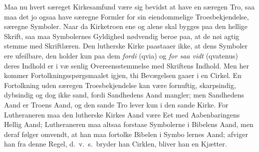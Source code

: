 \documentclass[12pt,a4paper]{article}
\begin{document}
Maa nu hvert særeget Kirkesamfund være sig bevidst at
have en særegen Tro, saa maa det jo ogsaa have særegne Formler
for sin eiendommelige Troesbekjendelse, særegne Symboler. Naar
da Kirketroen ene og alene skal bygges paa den hellige Skrift,
saa maa Symbolernes Gyldighed nødvendig beroe paa, at de nøi\-%
agtig stemme med Skriftlæren. Den lutherske Kirke paastaaer
ikke, at dens Symboler ere ufeilbare, den holder kun paa dem
\emph{fordi} (qvia) og \emph{for saa vidt} (qvatenus) deres Indhold er i væ\-%
senlig Overeensstemmelse med Skriftens Indhold. Men her kommer
Fortolkningsspørgsmaalet igjen, thi Bevægelsen gaaer i en Cirkel.
En Fortolkning uden særegen Troesbekjendelse kan være fornuftig,
skarpsindig, dybsindig og dog ikke sand, fordi Sandhedens Aand
mangler; men Sandhedens Aand er Troens Aand, og den sande
Tro lever kun i den sande Kirke. For Lutheraneren maa den
lutherske Kirkes Aand være Eet med Aabenbaringens Hellig Aand;
Lutheraneren maa altsaa forstaae Symbolerne i Bibelens Aand,
men deraf følger omvendt, at han maa fortolke Bibelen i Symbo\-%
lernes Aand; afviger han fra denne Regel, d.\ v.\ s.\ bryder han
Cirklen, bliver han en Kjætter.
\end{document}
